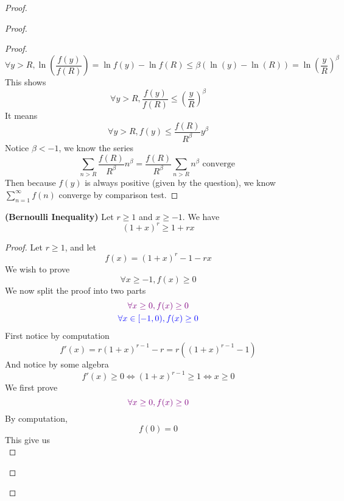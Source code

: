 \documentclass{report}
\begin{document}
\begin{proof}
\begin{proof}
\begin{proof}
\begin{equation}
\forall y>R,\ln ( \frac{f(y)}{f(R)})=\ln f(y)-\ln f(R)\leq \beta (\ln(y)-\ln(R))= \ln(\frac{y}{R})^\beta 
\end{equation}
This shows
\begin{equation}
\forall y>R, \frac{f(y)}{f(R)}\leq (\frac{y}{R})^{\beta }
\end{equation}
It means
\begin{equation}
\forall y>R, f(y)\leq \frac{f(R)}{R^{\beta }}y^{\beta }
\end{equation}
Notice $\beta <-1$, we know the series 
\begin{equation}
\sum_{n>R} \frac{f(R)}{R^{\beta }}n^{\beta }=\frac{f(R)}{R^{\beta }}\sum_{n>R}n^{\beta }\text{ converge }
\end{equation}
Then because $f(y)$ is always positive (given by the question), we know $\sum_{n=1}^\infty f(n)$ converge by comparison test.
\end{proof}
\begin{lemma}
\label{3.3.4}
\textbf{(Bernoulli Inequality)} Let  $r\geq 1$ and $x\geq -1$. We have
\begin{equation}
  (1+x)^r\geq 1+rx
\end{equation}
\end{lemma}
\begin{proof}
Let $r\geq 1$, and let
\begin{equation}
f(x)=(1+x)^r-1-rx
\end{equation}
We wish to prove 
\begin{equation}
\forall x\geq -1, f(x)\geq 0
\end{equation}
We now split the proof into two parts
\begin{gather}
  \textcolor{violet}{\forall x\geq 0, f(x)\geq 0}\\
  \textcolor{blue}{\forall x\in [-1,0), f(x)\geq 0}
\end{gather}
First notice by computation
\begin{equation}
f'(x)=r(1+x)^{r-1}-r=r((1+x)^{r-1}-1)
\end{equation}
And notice by some algebra
\begin{equation}
f'(x)\geq 0\iff  (1+x)^{r-1}\geq 1\iff  x\geq 0
\end{equation}
We first prove 
\begin{equation}
\textcolor{violet}{\forall x\geq 0, f(x)\geq 0}
\end{equation}
By computation,
\begin{equation}
f(0)=0
\end{equation}
This give us 
\begin{equation}

\end{equation}
\end{proof}
\end{proof}
\end{proof}
\end{document}

